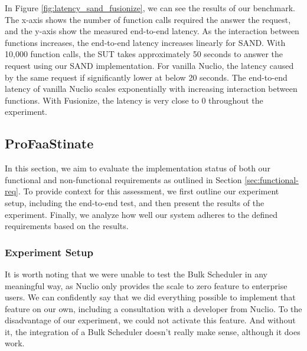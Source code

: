 In Figure \ref{fig:latency_sand_fusionize}, we can see the results of our
benchmark. The x-axis shows the number of function calls required the answer the
request, and the y-axis show the measured end-to-end latency. As the interaction
between functions increases, the end-to-end latency increases linearly for SAND.
With 10,000 function calls, the SUT takes approximately 50 seconds to answer the
request using our SAND implementation. For vanilla Nuclio, the latency caused by
the same request if significantly lower at below 20 seconds. The end-to-end
latency of vanilla Nuclio scales exponentially with increasing interaction
between functions. With Fusionize, the latency is very close to 0 throughout the
experiment.


\subsection{ProFaaStinate}
\label{sec:eval-profaastinate}
In this section, we aim to evaluate the implementation status of both our functional and non-functional requirements as outlined in Section \ref{sec:functional-req}. To provide context for this assessment, we first outline our experiment setup, including the end-to-end test, and then present the results of the experiment. Finally, we analyze how well our system adheres to the defined requirements based on the results.

\subsubsection{Experiment Setup}

It is worth noting that we were unable to test the Bulk Scheduler in any meaningful way, as Nuclio only provides the scale to zero feature to enterprise users. We can confidently say that we did everything possible to implement that feature on our own, including a consultation with a developer from Nuclio. To the disadvantage of our experiment, we could not activate this feature. And without it, the integration of a Bulk Scheduler doesn't really make sense, although it does work.

